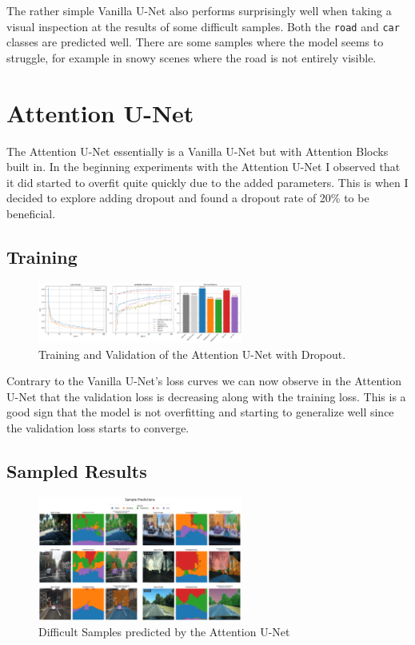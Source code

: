 The rather simple Vanilla U-Net also performs surprisingly well when taking a visual inspection at the results of some difficult samples. Both the \texttt{road} and \texttt{car} classes are predicted well. There are some samples where the model seems to struggle, for example in snowy scenes where the road is not entirely visible. 

\section{Attention U-Net}

The Attention U-Net essentially is a Vanilla U-Net but with Attention Blocks built in. In the beginning experiments with the Attention U-Net I observed that it did started to overfit quite quickly due to the added parameters. This is when I decided to explore adding dropout and found a dropout rate of 20\% to be beneficial.

\subsection{Training}

\begin{figure}[h] 
    \centering 
    \includegraphics[width=0.6\textwidth]{figures/attention_dropout_training.png} 
    \caption{Training and Validation of the Attention U-Net with Dropout.}
    \label{fig:attention_dropout_training} 
\end{figure}

Contrary to the Vanilla U-Net's loss curves we can now observe in the Attention U-Net that the validation loss is decreasing along with the training loss. This is a good sign that the model is not overfitting and starting to generalize well since the validation loss starts to converge.

\subsection{Sampled Results}

\begin{figure}[h] 
    \centering 
    \includegraphics[width=0.6\textwidth]{figures/attention_samples.png} 
    \caption{Difficult Samples predicted by the Attention U-Net}
    \label{fig:attention_samples} 
\end{figure}


